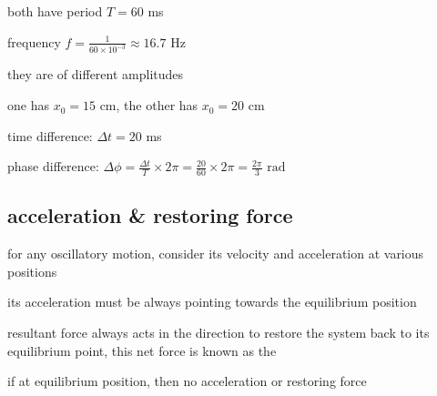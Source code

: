 
\begin{marginfigure}
	\vspace*{-12pt}
		\centering
{}
\vspace*{-25pt}
\end{marginfigure}

\sol both have period $T=60$ ms

frequency $f=\frac{1}{60\times10^{-3}} \approx 16.7$ Hz

they are of different amplitudes

one has $x_0=15$ cm, the other has $x_0=20$ cm

time difference: $\Delta t = 20$ ms

phase difference: $\Delta \phi = \frac{\Delta t}{T} \times 2\pi = \frac{20}{60} \times 2\pi = \frac{2\pi}{3} \text{ rad}$



\subsection{acceleration \& restoring force}
for any oscillatory motion, consider its velocity and acceleration at various positions

its acceleration must be always pointing towards the equilibrium position

resultant force always acts in the direction to restore the system back to its equilibrium point, this net force is known as the 

if at equilibrium position, then no acceleration or restoring force





